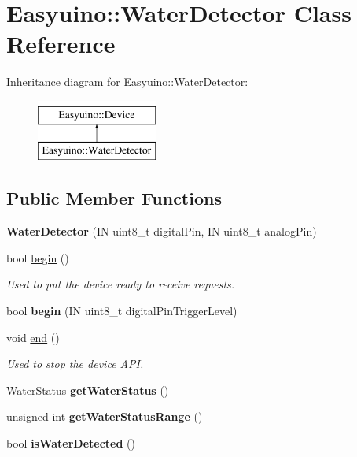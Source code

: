 \hypertarget{class_easyuino_1_1_water_detector}{}\section{Easyuino\+:\+:Water\+Detector Class Reference}
\label{class_easyuino_1_1_water_detector}
Inheritance diagram for Easyuino\+:\+:Water\+Detector\+:\begin{figure}[H]
\begin{center}
\leavevmode
\includegraphics[height=2.000000cm]{class_easyuino_1_1_water_detector}
\end{center}
\end{figure}
\subsection*{Public Member Functions}
\begin{DoxyCompactItemize}
\item 
\mbox{\label{class_easyuino_1_1_water_detector_a33690612b2b89efcfb97d4967b16c617}} 
{\bfseries Water\+Detector} (IN uint8\+\_\+t digital\+Pin, IN uint8\+\_\+t analog\+Pin)
\item 
bool \hyperlink{class_easyuino_1_1_water_detector_af7a0ec32d6abcb8c1060f493525d5228}{begin} ()
\begin{DoxyCompactList}\small\item\em Used to put the device ready to receive requests. \end{DoxyCompactList}\item 
\mbox{\label{class_easyuino_1_1_water_detector_a06ac56298c56026691d7d6a9dbb63748}} 
bool {\bfseries begin} (IN uint8\+\_\+t digital\+Pin\+Trigger\+Level)
\item 
void \hyperlink{class_easyuino_1_1_water_detector_a9c1473536f47b2a7d8e1f8fb1bf5f3fd}{end} ()
\begin{DoxyCompactList}\small\item\em Used to stop the device A\+PI. \end{DoxyCompactList}\item 
\mbox{\label{class_easyuino_1_1_water_detector_a0dfefd3b3aa2ed21f30ceb8041a8652a}} 
Water\+Status {\bfseries get\+Water\+Status} ()
\item 
\mbox{\label{class_easyuino_1_1_water_detector_a4a4c4a0ab6ae8a51535762f38b4f0d01}} 
unsigned int {\bfseries get\+Water\+Status\+Range} ()
\item 
\mbox{\label{class_easyuino_1_1_water_detector_a9ea69c2eec25543fad47759379d62ce6}} 
bool {\bfseries is\+Water\+Detected} ()
\end{DoxyCompactItemize}
